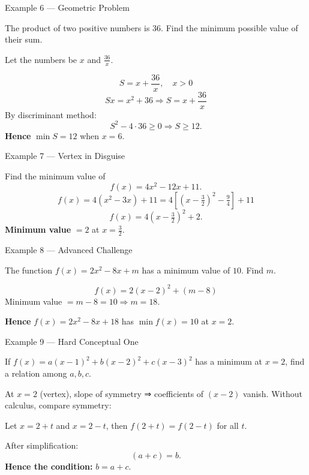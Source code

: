 \documentclass[12pt]{beamer}
\begin{document}
\begin{frame}{Example 6 — Geometric Problem}

The product of two positive numbers is $36$.  
Find the minimum possible value of their sum.

\pause
Let the numbers be $x$ and $\frac{36}{x}$.

\[
S = x + \frac{36}{x}, \quad x>0
\]
\[
Sx = x^2 + 36 \Rightarrow S = x + \frac{36}{x}
\]
By discriminant method:
\[
S^2 - 4\cdot36 \ge 0 \Rightarrow S \ge 12.
\]
\textbf{Hence } $\min S = 12$ when $x = 6$.

\end{frame}

\begin{frame}{Example 7 — Vertex in Disguise}

Find the minimum value of 
\[
f(x) = 4x^2 - 12x + 11.
\]
\pause
\[
f(x) = 4(x^2 - 3x) + 11 = 4\left[(x - \tfrac{3}{2})^2 - \tfrac{9}{4}\right] + 11
\]
\[
f(x) = 4(x - \tfrac{3}{2})^2 + 2.
\]
\textbf{Minimum value } $= 2$ at $x = \tfrac{3}{2}$.

\end{frame}

\begin{frame}{Example 8 — Advanced Challenge}

The function $f(x) = 2x^2 - 8x + m$ has a minimum value of $10$.  
Find $m$.

\pause
\[
f(x) = 2(x-2)^2 + (m - 8)
\]
Minimum value $= m - 8 = 10 \Rightarrow m = 18$.

\textbf{Hence } $f(x) = 2x^2 - 8x + 18$ has $\min f(x) = 10$ at $x=2$.

\end{frame}

\begin{frame}{Example 9 — Hard Conceptual One}

If $f(x) = a(x-1)^2 + b(x-2)^2 + c(x-3)^2$ has a minimum at $x=2$,  
find a relation among $a,b,c$.

\pause
At $x=2$ (vertex), slope of symmetry ⇒ coefficients of $(x-2)$ vanish.
Without calculus, compare symmetry:

Let $x = 2 + t$ and $x = 2 - t$, then $f(2+t)=f(2-t)$ for all $t$.

After simplification:
\[
(a+c) = b.
\]
\textbf{Hence the condition: } $b = a + c.$

\end{frame}
\end{document}
